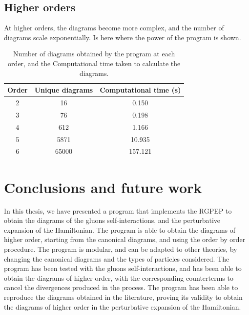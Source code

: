 \documentclass[11pt,a4paper,twoside,pdf]{article}
\numberwithin{equation}{section}
\begin{document}
\newpage


\subsection{Higher orders}

At higher orders, the diagrams become more complex, and the number of diagrams scale 
exponentially. Is here where the power of the program is shown. 

\begin{table} [h!]
    \centering
    \begin{tabular}{|c|c|c|}
        \hline
        Order & Unique diagrams & Computational time (s)\\
        \hline
        2  & 16 & 0.150\\
        3  & 76 & 0.198\\
        4  & 612 & 1.166\\
        5  & 5871  & 10.935\\
        6  & 65000  & 157.121\\
        \hline
    \end{tabular}
    \caption{Number of diagrams obtained by the program at each order, and the Computational
    time taken to calculate the diagrams.}
    \label{tab:diagrams}
\end{table}

\newpage

\section{Conclusions and future work} \label{sec:conclusions}


In this thesis, we have presented a program that implements the RGPEP to obtain the
diagrams of the gluons self-interactions, and the perturbative expansion of the
Hamiltonian. The program is able to obtain the diagrams of higher order, starting
from the canonical diagrams, and using the order by order procedure.
The program is modular, and can be adapted to other theories, by changing the
canonical diagrams and the types of particles considered.
The program has been tested with the gluons self-interactions, and has been able to
obtain the diagrams of higher order, with the corresponding counterterms to cancel
the divergences produced in the process. The program has been able to reproduce the
diagrams obtained in the literature, proving its validity to obtain the diagrams of
higher order in the perturbative expansion of the Hamiltonian.
\end{document}
